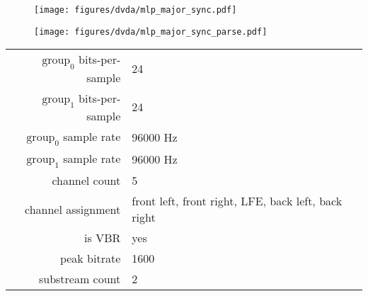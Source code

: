 \clearpage

\begin{figure}[h]
  \texttt{[image: figures/dvda/mlp\_major\_sync.pdf]}
\end{figure}
\begin{figure}[h]
  \texttt{[image: figures/dvda/mlp\_major\_sync\_parse.pdf]}
\end{figure}
{
\begin{tabular}{rl}
  $\text{group}_0$ bits-per-sample & 24 \\
  $\text{group}_1$ bits-per-sample & 24 \\
  $\text{group}_0$ sample rate & 96000 Hz \\
  $\text{group}_1$ sample rate & 96000 Hz \\
  channel count & 5 \\
  channel assignment & front left, front right, LFE, back left, back right \\
  is VBR & yes \\
  peak bitrate & 1600 \\
  substream count & 2 \\
\end{tabular}
}

\clearpage

